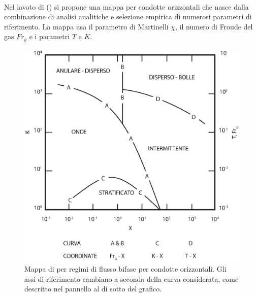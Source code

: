 \paragraph{\textcite{taitel1976model}}
Nel lavoto di \textcite{taitel1976model} () si propone una mappa per condotte orizzontali che nasce dalla combinazione di analisi analitiche e selezione empirica di numerosi parametri di riferimento. La mappa usa il parametro di Martinelli \(\chi\), il numero di Froude del gas \(Fr_g\) e i parametri \(T\) e \(K\).

\begin{figure}[htbp]
    \centering
    \includegraphics[width=.6\textwidth]{fig/fluidodinamica/taitel.eps}
    \caption{Mappa di \textcite{taitel1976model} per regimi di flusso bifase per condotte orizzontali. Gli assi di riferimento cambiano a seconda della curva considerata, come descritto nel pannello al di sotto del grafico.}
    \label{fig:taitel}
\end{figure}

